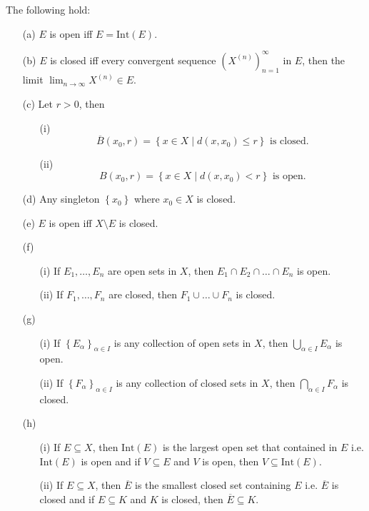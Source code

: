 \begin{proposition} \label{prop: many properties of open and closed set}
    The following hold: 
    \begin{itemize}
        \item [(a)] \(E\) is open iff \(E = \mathrm{Int}(E) \). 
        \item [(b)] \(E\) is closed iff every convergent sequence \(\left( X^{(n)} \right)_{n=1}^{\infty}  \) in \(E\), then the limit \(\lim_{n \to \infty} X^{(n)} \in E\). 
        \item [(c)] Let \(r > 0\), then 
        \begin{itemize}
            \item [(i)]         \[
            \overline{B}(x_0, r) = \left\{ x \in X \mid d(x, x_0) \le r \right\}  \text{ is closed.}
        \]
            \item [(ii)]        \[
            B(x_0, r) = \left\{ x \in X \mid d(x, x_0) < r \right\} \text{ is open.}
        \]
        \end{itemize}

        \item [(d)] Any singleton \(\left\{ x_0 \right\} \) where \(x_0 \in X\) is closed. 
        \item [(e)] \(E\) is open iff \(X\setminus E\) is closed. 
        \item [(f)]
        \begin{itemize}
            \item [(i)]
        If \(E_1, \dots , E_n\) are open sets in \(X\), then \(E_1 \cap E_2 \cap \dots \cap E_n\) is open.
            \item [(ii)] If \(F_1, \dots , F_n\) are closed, then \(F_1 \cup \dots \cup F_n\) is closed. 
        \end{itemize}
        \item [(g)]
        \begin{itemize}
            \item [(i)] If \(\left\{ E_\alpha  \right\}_{\alpha  \in I} \) is any collection of open sets in \(X\), then \(\bigcup_{\alpha \in I} E_\alpha  \) is open.
            \item [(ii)] If \(\left\{ F_\alpha  \right\}_{\alpha \in I} \) is any collection of closed sets in \(X\), then \(\bigcap_{\alpha  \in I} F_\alpha  \) is closed. 
        \end{itemize}
        \item [(h)] 
        \begin{itemize}
            \item [(i)] If \(E \subseteq X\), then \(\mathrm{Int}(E) \) is the largest open set that contained in \(E\) i.e. \(\mathrm{Int}(E) \) is open and if \(V \subseteq E\) and \(V\) is open, then \(V \subseteq \mathrm{Int}(E) \).
            \item [(ii)] If \(E \subseteq X\), then \(\overline{E} \) is the smallest closed set containing \(E\) i.e. \(\overline{E} \) is closed and if \(E \subseteq K\) and \(K\) is closed, then \(\overline{E} \subseteq K\). 
        \end{itemize}                   
    \end{itemize}
\end{proposition}
